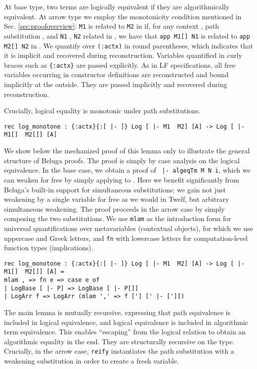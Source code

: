 \documentclass[copyright,creativecommons]{eptcs}
\begin{document}
At base type, two terms are logically equivalent if they are algorithmically
equivalent. At arrow type we employ the monotonicity condition
mentioned in Sec. \ref{sec:proofoverview}:
\lstinline{M1} is related to \lstinline{M2} in  if, for any
context , path substitution , and \lstinline{N1} , \lstinline{N2} related in , we
have that \lstinline{app M1[] N1} is related to
\lstinline{app M2[] N2} in . We quantify over
\lstinline{(:actx)} in round parentheses, which indicates that it
is implicit and recovered during reconstruction. Variables quantified
in curly braces such as \lstinline!{:actx}! are passed
explicitly. As in LF specifications, all free variables occurring in constructor definitions are reconstructed
and bound implicitly at the outside. They are passed implicitly and recovered
during reconstruction. 


Crucially, logical equality is monotonic under path substitutions.

\begin{lstlisting}
rec log_monotone : {:actx}{:[ |- ]} Log [ |- M1  M2] [A] -> Log [ |- M1[]  M2[]] [A]
\end{lstlisting}

We show below the mechanized proof of this lemma only to illustrate the
general structure of Beluga proofs. The proof is simply by case
analysis on the logical equivalence. In the base case, we obtain a proof 
of \lstinline{ |- algeqTm M N i}, which we can weaken for free
by simply applying  to . Here we benefit significantly from
Beluga's built-in support for simultaneous substitutions; we gain not
just weakening by a single variable for free as we would in Twelf, but arbitrary simultaneous
weakening. The proof proceeds in the arrow case by simply
composing the two substitutions. We use \lstinline{mlam} as the introduction form for universal
quantifications over metavariables (contextual objects), for which we
use uppercase and Greek letters, and \lstinline{fn} with lowercase letters for
computation-level function types (implications).

\begin{lstlisting}
rec log_monotone : {:actx}{:[ |- ]} Log [ |- M1  M2] [A] -> Log [ |- M1[]  M2[]] [A] =
mlam , => fn e => case e of
| LogBase [ |- P] => LogBase [ |- P[]]
| LogArr f => LogArr (mlam ',' => f ['] [' |- [']])
\end{lstlisting}

The main lemma is mutually recursive, expressing that path
equivalence is included in logical equivalence, and logical
equivalence is included in algorithmic term equivalence. This enables
``escaping'' from the logical relation to obtain an algorithmic
equality in the end. They are
structurally recursive on the type. Crucially, in the arrow case,
\lstinline{reify} instantiates the path substitution \lstinline{}
with a weakening substitution in order to create a fresh variable.
\end{document}
